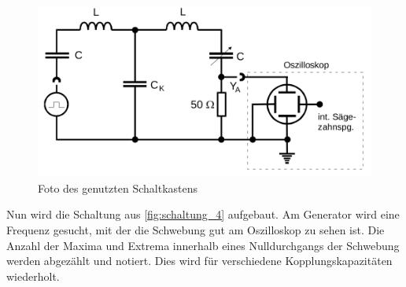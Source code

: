 \begin{figure}
    \centering
    \includegraphics[width=\textwidth/2]{images/schaltung_4.png}
    \caption{Foto des genutzten Schaltkastens}
    \label{fig:schaltung_4}
\end{figure}

Nun wird die Schaltung aus \autoref{fig:schaltung_4} aufgebaut.
Am Generator wird eine Frequenz gesucht, mit der die Schwebung gut am Oszilloskop zu sehen ist. Die Anzahl der Maxima und Extrema innerhalb eines Nulldurchgangs der Schwebung werden abgezählt und notiert. 
Dies wird für verschiedene Kopplungskapazitäten wiederholt.